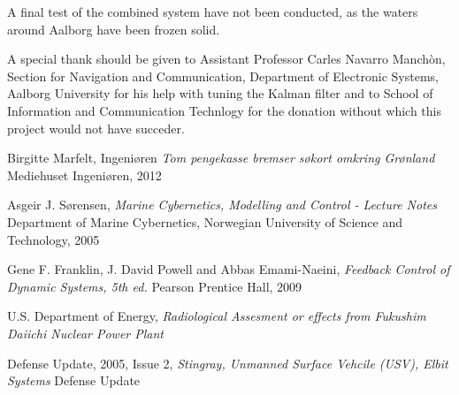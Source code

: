 \documentclass{ifacconf}
\begin{document}
A final test of the combined system have not been conducted, as the waters around Aalborg have been frozen solid. 

\begin{ack}                               %
A special thank should be given to Assistant Professor Carles Navarro Manchòn, Section for Navigation and Communication, Department of Electronic Systems, Aalborg University for his help with tuning the Kalman filter and to School of Information and Communication Technlogy for the donation without which this project would not have succeder.  %
\end{ack}

%

\begin{thebibliography}{xx}

Birgitte Marfelt,
\newblock Ingeni\o ren
\newblock \emph{Tom pengekasse bremser søkort omkring Gr\o nland}
\newblock Mediehuset Ingeniøren, 2012

Asgeir J. S\o rensen,
\newblock \emph{Marine Cybernetics, Modelling and Control - Lecture Notes}
\newblock Department of Marine Cybernetics, Norwegian University of Science and Technology, 2005

Gene F. Franklin, J. David Powell and Abbas Emami-Naeini,
\newblock \emph{Feedback Control of Dynamic Systems, 5th ed.}
\newblock Pearson Prentice Hall, 2009

{U.S. Department of Energy},
\newblock \emph{Radiological Assesment or effects from Fukushim Daiichi Nuclear Power Plant}

Defense Update, 2005, Issue 2,
\newblock \emph{Stingray, Unmanned Surface Vehcile (USV), Elbit Systems}
\newblock Defense Update

\end{thebibliography}
\end{document}
